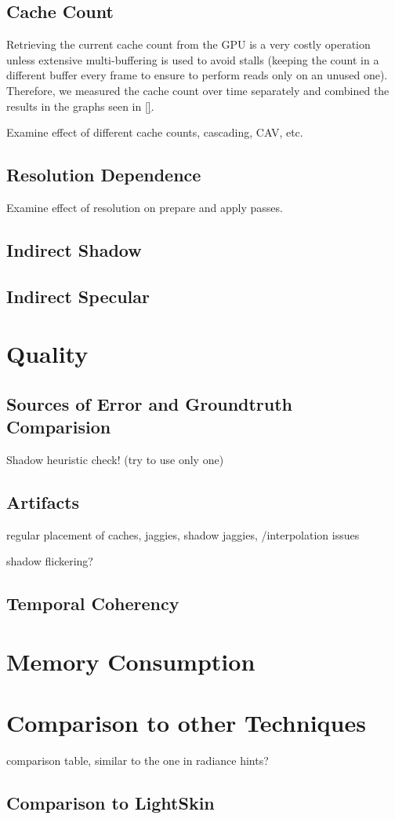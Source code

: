\documentclass[thesis.tex]{subfiles}
\begin{document}
\subsection{Cache Count}
Retrieving the current cache count from the GPU is a very costly operation unless extensive multi-buffering is used to avoid stalls (keeping the count in a different buffer every frame to ensure to perform reads only on an unused one).
Therefore, we measured the cache count over time separately and combined the results in the graphs seen in \autoref{}.

Examine effect of different cache counts, cascading, CAV, etc.

\subsection{Resolution Dependence}
Examine effect of resolution on prepare and apply passes.

\subsection{Indirect Shadow}


\subsection{Indirect Specular}

\newpage

\section{Quality}

\subsection{Sources of Error and Groundtruth Comparision}
Shadow heuristic check! (try to use only one)

\subsection{Artifacts}
regular placement of caches, jaggies,
shadow jaggies,
/interpolation issues

shadow flickering?

\subsection{Temporal Coherency}


\section{Memory Consumption}

\section{Comparison to other Techniques} \label{sec:eva:comparisiontoother}

comparison table, similar to the one in radiance hints?

\subsection{Comparison to LightSkin}

\subfilebib %
\end{document}
